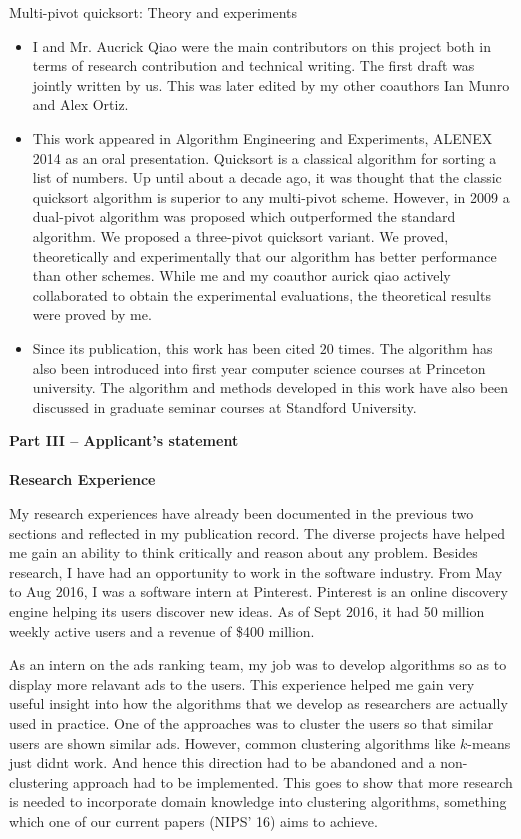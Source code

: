 \documentclass[12pt]{article}
\begin{document}
\vspace{0.15in}\noindent Multi-pivot quicksort: Theory and experiments
\begin{itemize}[nolistsep]
\item I and Mr. Aucrick Qiao were the main contributors on this project both in terms of research contribution and technical writing. The first draft was jointly written by us. This was later edited by my other coauthors Ian Munro and Alex Ortiz. 
\item This work appeared in Algorithm Engineering and Experiments, ALENEX 2014 as an oral presentation. Quicksort is a classical algorithm for sorting a list of numbers. Up until about a decade ago, it was thought that the classic quicksort algorithm is superior to any multi-pivot scheme. However, in 2009 a dual-pivot algorithm was proposed which outperformed the standard algorithm. We proposed a three-pivot quicksort variant. We proved, theoretically and experimentally that our algorithm has better performance than other schemes. While me and my coauthor aurick qiao actively collaborated to obtain the experimental evaluations, the theoretical results were proved by me.
\item Since its publication, this work has been cited $20$ times. The algorithm has also been introduced into first year computer science courses at Princeton university. The algorithm and methods developed in this work have also been discussed in graduate seminar courses at Standford University. 
\end{itemize}

\vspace{0.2in}\noindent\textbf{Part III – Applicant's statement}\\\\
\textbf{Research Experience}

\vspace{0.1in}\noindent My research experiences have already been documented in the previous two sections and reflected in my publication record. The diverse projects have helped me gain an ability to think critically and reason about any problem. Besides research, I have had an opportunity to work in the software industry. From May to Aug 2016, I was a software intern at Pinterest. Pinterest is an online discovery engine helping its users discover new ideas. As of Sept 2016, it had 50 million weekly active users and a revenue of \$400 million. 

As an intern on the ads ranking team, my job was to develop algorithms so as to display more relavant ads to the users. This experience helped me gain very useful insight into how the algorithms that we develop as researchers are actually used in practice. One of the approaches was to cluster the users so that similar users are shown similar ads. However, common clustering algorithms like  $k$-means just didnt work. And hence this direction had to be abandoned and a non-clustering approach had to be implemented. This goes to show that more research is needed to incorporate domain knowledge into clustering algorithms, something which one of our current papers (NIPS' 16) aims to achieve. \\
\end{document}
